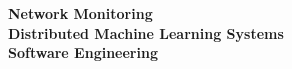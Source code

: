


\textbf{Network Monitoring} \\
\textbf{Distributed Machine Learning Systems} \\
\textbf{Software Engineering}\\
\hfill